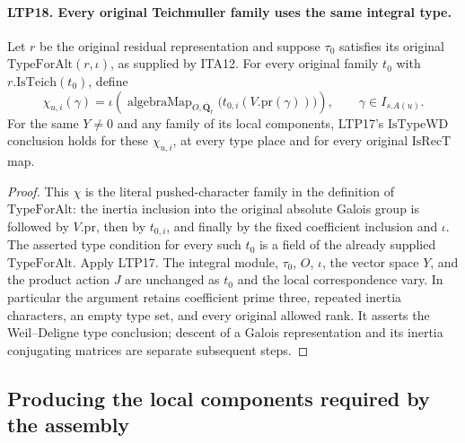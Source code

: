 \paragraph{LTP18. Every original Teichmuller family uses the same integral type.}
\label{claim:LTP18}
Let \(r\) be the original residual representation and suppose
\(\tau_0\) satisfies its original \(\mathrm{TypeForAlt}(r,\iota)\),
as supplied by ITA12.  For every original family \(t_0\) with
\(r.\mathrm{IsTeich}(t_0)\), define
\[
 \chi_{u,i}(\gamma)
       =\iota\!\left(\operatorname{algebraMap}_{O,\overline{\mathbf Q}_\ell}
                      \bigl(t_{0,i}(V.\mathrm{pr}(\gamma))\bigr)\right),
                         \qquad\gamma\in I_{s.A(u)} .
\]
For the same \(Y\ne0\) and any family of its local components,
LTP17's \(\mathrm{IsTypeWD}\) conclusion holds for these
\(\chi_{u,i}\), at every type place and for every original
\(\mathrm{IsRecT}\) map.
\begin{proof}
This \(\chi\) is the literal pushed-character family in the
definition of \(\mathrm{TypeForAlt}\): the inertia inclusion
into the original absolute Galois group is followed by
\(V.\mathrm{pr}\), then by \(t_{0,i}\), and finally by the
fixed coefficient inclusion and \(\iota\).
The asserted type condition for every such \(t_0\) is a field
of the already supplied \(\mathrm{TypeForAlt}\).
Apply LTP17.  The integral module, \(\tau_0\), \(O\), \(\iota\),
the vector space \(Y\), and the product action \(J\) are unchanged
as \(t_0\) and the local correspondence vary.
In particular the argument retains coefficient prime three,
repeated inertia characters, an empty type set, and every
original allowed rank.  It asserts the Weil--Deligne type
conclusion; descent of a Galois representation and its inertia
conjugating matrices are separate subsequent steps.
\end{proof}

\subsection{Producing the local components required by the assembly}

